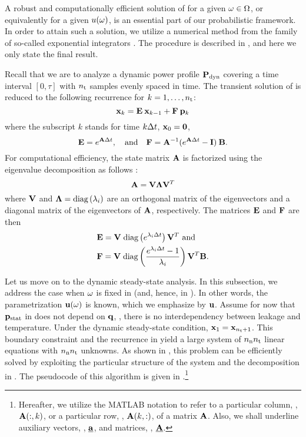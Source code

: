 A robust and computationally efficient solution of  for a given $\omega \in \Omega$, or equivalently for a given $u(\omega)$, is an essential part of our probabilistic framework.
In order to attain such a solution, we utilize a numerical method from the family of so-called exponential integrators \cite{hochbruck2010}.
The procedure is described in , and here we only state the final result.

Recall that we are to analyze a dynamic power profile $\mathbf{P}_{\text{dyn}}$ covering a time interval $[0, \tau]$ with ${n_\text{t}}$ samples evenly spaced in time.
The transient solution of  is reduced to the following recurrence for $k = 1, \dots, {n_\text{t}}$:
\begin{equation} \elabel{recurrence}
  \vX_k = \mE \: \vX_{k - 1} + \mF \: \vP_k
\end{equation}
where the subscript $k$ stands for time $k \Delta t$, $\mathbf{x}_0 = \mathbf{0}$,
\[
  \mathbf{E} = e^{\mathbf{A} \Delta t}, \hspace{1em} \text{and} \hspace{1em} \mathbf{F} = \mathbf{A}^{-1} (e^{\mathbf{A} \Delta t} - \mathbf{I}) \: \mathbf{B}.
\]
For computational efficiency, the state matrix $\mathbf{A}$ is factorized using the eigenvalue decomposition as follows \cite{press2007}:
\begin{equation} \elabel{eigenvalue-decomposition}
  \mA = \mV \mL \mV^T
\end{equation}
where $\mathbf{V}$ and $\mathbf{\Lambda} = \text{diag}\left( \lambda_i \right)$ are an orthogonal matrix of the eigenvectors and a diagonal matrix of the eigenvectors of $\mathbf{A}$, respectively.
The matrices $\mathbf{E}$ and $\mathbf{F}$ are then
\begin{align*}
  & \mathbf{E} = \mathbf{V} \; \text{diag}\left( e^{\lambda_i \Delta t} \right) \mathbf{V}^T \text{ and} \\
  & \mathbf{F} = \mathbf{V} \; \text{diag}\left(  \frac{e^{\lambda_i \Delta t} - 1}{\lambda_i}  \right) \mathbf{V}^T \mathbf{B}.
\end{align*}

Let us move on to the dynamic steady-state analysis.
In this subsection, we address the case when $\omega$ is fixed in  (and, hence, in ).
In other words, the parametrization $\mathbf{u}(\omega)$ is known, which we emphasize by $\mathbf{u}$.
Assume for now that $\mathbf{p}_{\text{stat}}$ in  does not depend on $\mathbf{q}$, \ie, there is no interdependency between leakage and temperature.
Under the dynamic steady-state condition, $\mathbf{x}_1 = \mathbf{x}_{{n_\text{t}} + 1}$.
This boundary constraint and the recurrence in  yield a large system of ${n_\text{n}} {n_\text{t}}$ linear equations with ${n_\text{n}} {n_\text{t}}$ unknowns.
As shown in \cite{ukhov2012}, this problem can be efficiently solved by exploiting the particular structure of the system and the decomposition in .
The pseudocode of this algorithm is given in .\footnote{Hereafter, we utilize the MATLAB notation to refer to a particular column, \eg, $\mathbf{A}(:, k)$, or a particular row, \eg, $\mathbf{A}(k, :)$, of a matrix $\mathbf{A}$. Also, we shall underline auxiliary vectors, \eg, $\underline{\mathbf{a}}$, and matrices, \eg, $\underline{\mathbf{A}}$.}


